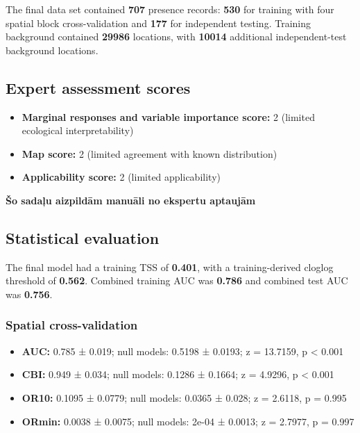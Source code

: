 \documentclass[
  openany]{book}
\providecommand{\tightlist}{%
  \setlength{\itemsep}{0pt}\setlength{\parskip}{0pt}}
\providecommand{\tightlist}{%
  \setlength{\itemsep}{0pt}%
  \setlength{\parskip}{0pt}%
}
\begin{document}
The final data set contained \textbf{707} presence records: \textbf{530} for training with four spatial block cross-validation and \textbf{177} for independent testing. Training background contained \textbf{29986} locations, with \textbf{10014} additional independent-test background locations.

\subsection*{Expert assessment scores}\label{expert-assessment-scores-20}

\begin{itemize}
\tightlist
\item
  \textbf{Marginal responses and variable importance score:} 2 (limited ecological interpretability)
\item
  \textbf{Map score:} 2 (limited agreement with known distribution)
\item
  \textbf{Applicability score:} 2 (limited applicability)
\end{itemize}

\textbf{Šo sadaļu aizpildām manuāli no ekspertu aptaujām}

\subsection*{Statistical evaluation}\label{statistical-evaluation-20}

The final model had a training TSS of \textbf{0.401}, with a training-derived cloglog threshold of \textbf{0.562}. Combined training AUC was \textbf{0.786} and combined test AUC was \textbf{0.756}.

\subsubsection*{Spatial cross-validation}\label{spatial-cross-validation-20}

\begin{itemize}
\tightlist
\item
  \textbf{AUC:} 0.785 ± 0.019; null models: 0.5198 ± 0.0193; z = 13.7159, p \textless{} 0.001
\item
  \textbf{CBI:} 0.949 ± 0.034; null models: 0.1286 ± 0.1664; z = 4.9296, p \textless{} 0.001
\item
  \textbf{OR10:} 0.1095 ± 0.0779; null models: 0.0365 ± 0.028; z = 2.6118, p = 0.995
\item
  \textbf{ORmin:} 0.0038 ± 0.0075; null models: 2e-04 ± 0.0013; z = 2.7977, p = 0.997
\end{itemize}
\end{document}
